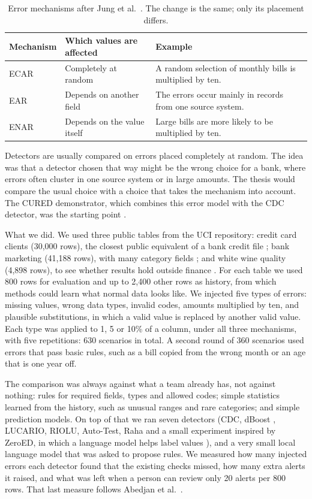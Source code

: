 \documentclass[11pt,a4paper]{article}
\begin{document}
\begin{table}[htbp]
\centering
\small
\begin{tabularx}{\textwidth}{@{}p{1.9cm}LL@{}}
\toprule
Mechanism & Which values are affected & Example \\
\midrule
ECAR & Completely at random & A random selection of monthly bills is multiplied by ten. \\
EAR & Depends on another field & The errors occur mainly in records from one source system. \\
ENAR & Depends on the value itself & Large bills are more likely to be multiplied by ten. \\
\bottomrule
\end{tabularx}
\caption{Error mechanisms after Jung et al.\ \cite{taberr}. The change is the same; only its placement differs.}
\label{tab:mech}
\end{table}

Detectors are usually compared on errors placed completely at random. The idea was that a detector chosen that way might be the wrong choice for a bank, where errors often cluster in one source system or in large amounts. The thesis would compare the usual choice with a choice that takes the mechanism into account. The CURED demonstrator, which combines this error model with the CDC detector, was the starting point \cite{cured}.

What we did. We used three public tables from the UCI repository: credit card clients (30{,}000 rows), the closest public equivalent of a bank credit file \cite{uci-credit}; bank marketing (41{,}188 rows), with many category fields \cite{uci-bank}; and white wine quality (4{,}898 rows), to see whether results hold outside finance \cite{uci-wine}. For each table we used 800 rows for evaluation and up to 2{,}400 other rows as history, from which methods could learn what normal data looks like. We injected five types of errors: missing values, wrong data types, invalid codes, amounts multiplied by ten, and plausible substitutions, in which a valid value is replaced by another valid value. Each type was applied to 1, 5 or 10\% of a column, under all three mechanisms, with five repetitions: 630 scenarios in total. A second round of 360 scenarios used errors that pass basic rules, such as a bill copied from the wrong month or an age that is one year off.

The comparison was always against what a team already has, not against nothing: rules for required fields, types and allowed codes; simple statistics learned from the history, such as unusual ranges and rare categories; and simple prediction models. On top of that we ran seven detectors (CDC, dBoost \cite{dboost}, LUCARIO, RIOLU, Auto-Test, Raha and a small experiment inspired by ZeroED, in which a language model helps label values \cite{zeroed}), and a very small local language model that was asked to propose rules. We measured how many injected errors each detector found that the existing checks missed, how many extra alerts it raised, and what was left when a person can review only 20 alerts per 800 rows. That last measure follows Abedjan et al.\ \cite{abedjan}.
\end{document}

